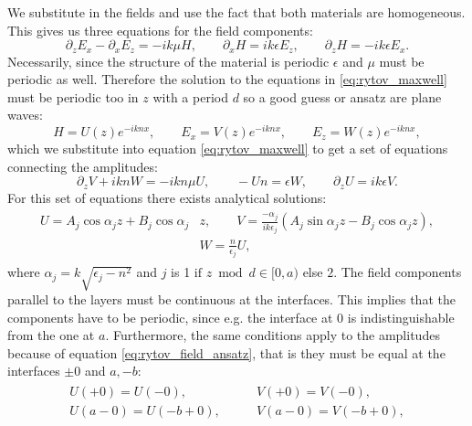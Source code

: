 We substitute in the fields and use the fact that both materials are homogeneous. This gives us three equations for the field components:
\begin{equation}
    \label{eq:rytov_maxwell}
    \partial_z E_x - \partial_x E_z = - ik \mu H,
    \qquad
    \partial_x H = ik \epsilon E_z,
    \qquad
    \partial_z H = -ik \epsilon E_x.
\end{equation}
Necessarily, since the structure of the material is periodic $\epsilon$ and $\mu$ must be periodic as well. Therefore the solution to the equations in \ref{eq:rytov_maxwell} must be periodic too in $z$ with a period $d$ so a good guess or ansatz are plane waves:
\begin{equation}
    \label{eq:rytov_field_ansatz}
    H = U(z)e^{-iknx},
    \qquad
    E_x = V(z)e^{-iknx},
    \qquad
    E_z = W(z)e^{-iknx},
\end{equation}
which we substitute into equation \ref{eq:rytov_maxwell} to get a set of equations connecting the amplitudes:
\begin{equation}
    \partial_z V + iknW = -ikn \mu U,
    \qquad
    -Un = \epsilon W,
    \qquad
    \partial_z U = ik \epsilon V.
\end{equation}
For this set of equations there exists analytical solutions:
\begin{align}
\begin{split}
    \label{eq:rytov_amplitudes}
    U=A_j\cos \alpha_jz + B_j\cos \alpha_j & z, 
    \qquad
    V=\frac{-\alpha_j}{ik\epsilon_j}(A_j\sin \alpha_j z -B_j\cos \alpha_j z ),
    \\
    &W=\frac{n}{\epsilon_j}U,
\end{split}
\end{align}
where $\alpha_j = k \sqrt{\epsilon_j-n^2}$ and $j$ is 1 $\text{if $z \bmod d \in [0, a)$}$ else $2$. The field components parallel to the layers must be continuous at the interfaces. This implies that the components have to be periodic, since e.g. the interface at $0$ is indistinguishable from the one at $a$. Furthermore, the same conditions apply to the amplitudes because of equation \ref{eq:rytov_field_ansatz}, that is they must be equal at the interfaces $\pm 0$ and $a, -b$:
\begin{align}
\begin{split}
    U(+0) = U(-0), 
    \qquad
    &V(+0) = V(-0),
    \\
    U(a-0) = U(-b+0),
    \qquad
    &V(a-0) = V(-b+0),
\end{split}
\end{align}
